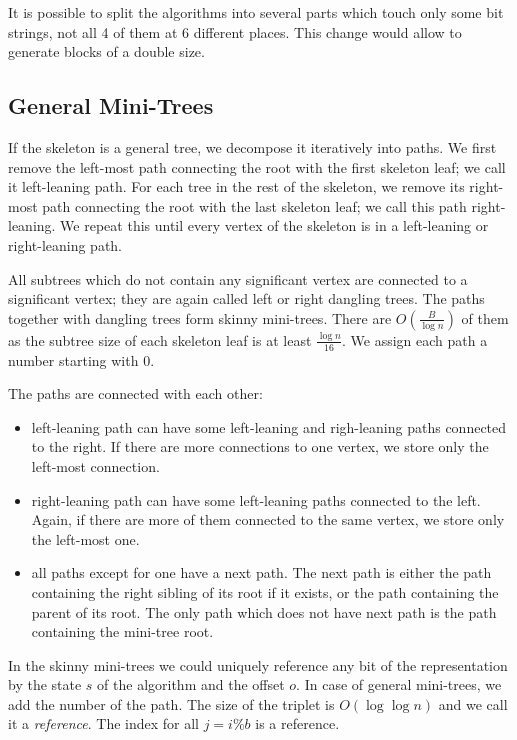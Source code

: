 It is possible to split the algorithms into several parts which touch only some bit strings, not all 4 of them at 6 different places.
This change would allow to generate blocks of a double size.

\subsection{General Mini-Trees}

If the skeleton is a general tree, we decompose it iteratively into paths.
We first remove the left-most path connecting the root with the first skeleton leaf; we call it left-leaning path.
For each tree in the rest of the skeleton, we remove its right-most path connecting the root with the last skeleton leaf; we call this path right-leaning.
We repeat this until every vertex of the skeleton is in a left-leaning or right-leaning path.

All subtrees which do not contain any significant vertex are connected to a significant vertex; they are again called left or right dangling trees.
The paths together with dangling trees form skinny mini-trees.
There are $O(\frac{B}{\log n})$ of them as the subtree size of each skeleton leaf is at least $\frac{\log n}{16}$.
We assign each path a number starting with $0$.

The paths are connected with each other:
\begin{itemize}
	\item left-leaning path can have some left-leaning and righ-leaning paths connected to the right.
	If there are more connections to one vertex, we store only the left-most connection.
	\item right-leaning path can have some left-leaning paths connected to the left.
	Again, if there are more of them connected to the same vertex, we store only the left-most one.
	\item all paths except for one have a next path.
	The next path is either the path containing the right sibling of its root if it exists, or the path containing the parent of its root.
	The only path which does not have next path is the path containing the mini-tree root.
\end{itemize}

In the skinny mini-trees we could uniquely reference any bit of the representation by the state $s$ of the algorithm and the offset $o$.
In case of general mini-trees, we add the number of the path.
The size of the triplet is $O(\log \log n)$ and we call it a \emph{reference}.
The index for all $j = i \% b$ is a reference.

